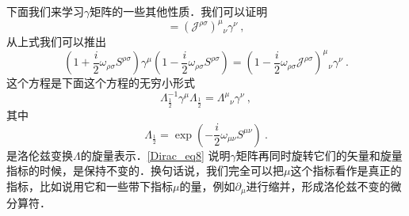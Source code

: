下面我们来学习$\gamma$矩阵的一些其他性质．我们可以证明
\begin{equation}
[\gamma^\mu,S^{\rho\sigma}] = (\mathcal J^{\rho\sigma})^\mu{}_\nu \gamma^\nu ~,
\end{equation}
从上式我们可以推出
\begin{equation}
(1+\frac{i}{2}\omega_{\rho\sigma}S^{\rho\sigma})\gamma^\mu (1-\frac{i}{2}\omega_{\rho\sigma}S^{\rho\sigma}) = (1-\frac{i}{2}\omega_{\rho\sigma}\mathcal J^{\rho\sigma})^\mu{}_\nu \gamma^\nu~.
\end{equation}
这个方程是下面这个方程的无穷小形式
\begin{equation}\label{Dirac_eq8}
\Lambda^{-1}_{\frac{1}{2}}\gamma^\mu\Lambda_{\frac{1}{2}}= \Lambda^\mu{}_\nu\gamma^\nu~,
\end{equation}
其中
\begin{equation}
\Lambda_{\frac{1}{2}} = \exp (-\frac{i}{2}\omega_{\mu\nu}S^{\mu\nu})~. 
\end{equation}
是洛伦兹变换$\Lambda$的旋量表示．\autoref{Dirac_eq8} 说明$\gamma$矩阵再同时旋转它们的矢量和旋量指标的时候，是保持不变的．换句话说，我们完全可以把$\mu$这个指标看作是真正的指标，比如说用它和一些带下指标$\mu$的量，例如$\partial_\mu$进行缩并，形成洛伦兹不变的微分算符．


